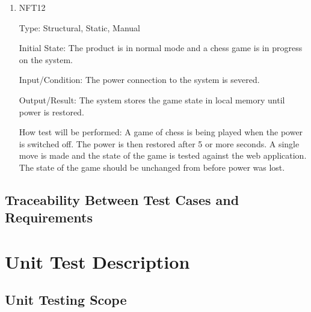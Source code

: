 \documentclass[12pt, titlepage]{article}
\begin{document}
\begin{enumerate}
    \item{NFT12}

        Type: Structural, Static, Manual
                            
        Initial State: The product is in normal mode and a chess game is in progress on the system.
                            
        Input/Condition: The power connection to the system is severed.
                            
        Output/Result: The system stores the game state in local memory until power is restored.
                            
        How test will be performed: A game of chess is being played when the power is switched off. The power is then restored after 5 or more seconds. A single
            move is made and the state of the game is tested against the web application. The state of the game should be unchanged from before power was lost.
\end{enumerate}

\subsection{Traceability Between Test Cases and Requirements}


\section{Unit Test Description}


\subsection{Unit Testing Scope}

\end{document}
